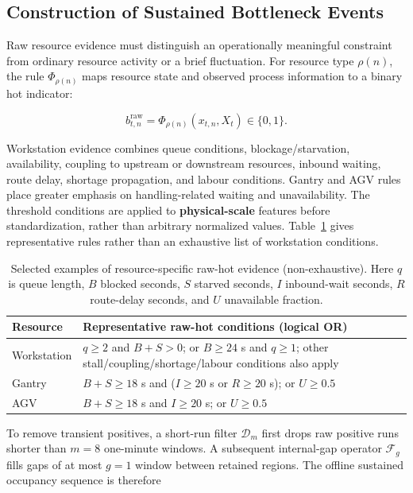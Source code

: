 \subsection{Construction of Sustained Bottleneck Events}\label{construction-of-sustained-bottleneck-events}

Raw resource evidence must distinguish an operationally meaningful constraint from ordinary resource activity or a brief fluctuation. For resource type \(\rho(n)\), the rule \(\Phi_{\rho(n)}\) maps resource state and observed process information to a binary hot indicator:

\[
b^{\mathrm{raw}}_{t,n}=\Phi_{\rho(n)}(x_{t,n},X_t)\in\{0,1\}.
\]

Workstation evidence combines queue conditions, blockage/starvation, availability, coupling to upstream or downstream resources, inbound waiting, route delay, shortage propagation, and labour conditions. Gantry and AGV rules place greater emphasis on handling-related waiting and unavailability. The threshold conditions are applied to \textbf{physical-scale} features before standardization, rather than arbitrary normalized values. Table~\ref{tab:raw-hot} gives representative rules rather than an exhaustive list of workstation conditions.

\begin{table}[!htbp]
\centering
\caption{Selected examples of resource-specific raw-hot evidence (non-exhaustive). Here $q$ is queue length, $B$ blocked seconds, $S$ starved seconds, $I$ inbound-wait seconds, $R$ route-delay seconds, and $U$ unavailable fraction.}
\label{tab:raw-hot}
\small
\begin{tabularx}{\linewidth}{@{}p{2.35cm} X@{}}
\toprule
Resource & Representative raw-hot conditions (logical OR) \\
\midrule
Workstation & $q\geq2$ and $B+S>0$; or $B\geq24$ s and $q\geq1$; other stall/coupling/shortage/labour conditions also apply \\
Gantry & $B+S\geq18$ s and ($I\geq20$ s or $R\geq20$ s); or $U\geq0.5$ \\
AGV & $B+S\geq18$ s and $I\geq20$ s; or $U\geq0.5$ \\
\bottomrule
\end{tabularx}
\end{table}
\FloatBarrier

To remove transient positives, a short-run filter \(\mathcal{D}_m\) first drops raw positive runs shorter than \(m=8\) one-minute windows. A subsequent internal-gap operator \(\mathcal{F}_g\) fills gaps of at most \(g=1\) window between retained regions. The offline sustained occupancy sequence is therefore


